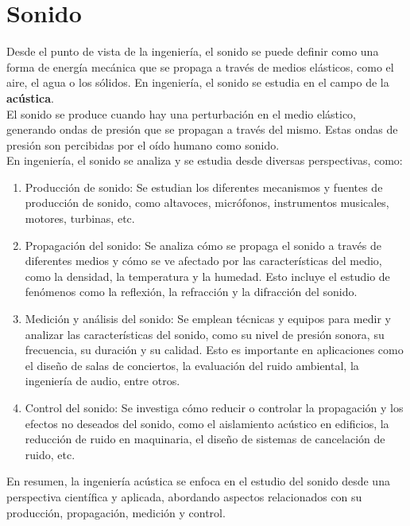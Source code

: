 \documentclass[
	12pt, %
	fleqn, %
	a4paper, %
	oneside, %
]{LegrandOrangeBook}
\begin{document}
\chapter{Sonido}
Desde el punto de vista de la ingeniería, el sonido se puede definir como una forma de energía mecánica que se propaga a través de medios elásticos, como el aire, el agua o los sólidos. En ingeniería, el sonido se estudia en el campo de la \textbf{acústica}.\\
El sonido se produce cuando hay una perturbación en el medio elástico, generando ondas de presión que se propagan a través del mismo. Estas ondas de presión son percibidas por el oído humano como sonido.\\
En ingeniería, el sonido se analiza y se estudia desde diversas perspectivas, como:
\begin{enumerate}
\item Producción de sonido: Se estudian los diferentes mecanismos y fuentes de producción de sonido, como altavoces, micrófonos, instrumentos musicales, motores, turbinas, etc.
\item Propagación del sonido: Se analiza cómo se propaga el sonido a través de diferentes medios y cómo se ve afectado por las características del medio, como la densidad, la temperatura y la humedad. Esto incluye el estudio de fenómenos como la reflexión, la refracción y la difracción del sonido.
\item Medición y análisis del sonido: Se emplean técnicas y equipos para medir y analizar las características del sonido, como su nivel de presión sonora, su frecuencia, su duración y su calidad. Esto es importante en aplicaciones como el diseño de salas de conciertos, la evaluación del ruido ambiental, la ingeniería de audio, entre otros.
\item Control del sonido: Se investiga cómo reducir o controlar la propagación y los efectos no deseados del sonido, como el aislamiento acústico en edificios, la reducción de ruido en maquinaria, el diseño de sistemas de cancelación de ruido, etc.
\end{enumerate}
En resumen, la ingeniería acústica se enfoca en el estudio del sonido desde una perspectiva científica y aplicada, abordando aspectos relacionados con su producción, propagación, medición y control.
\end{document}

